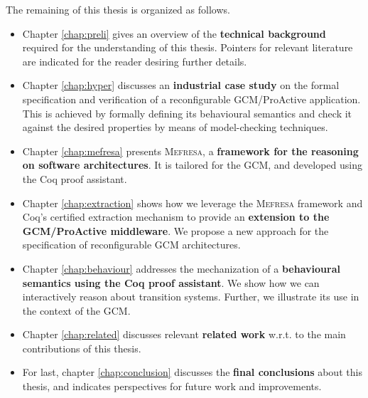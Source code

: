	The remaining of this thesis is organized as follows.


	\begin{itemize}
		\item Chapter \ref{chap:preli} gives an overview of the \textbf{technical background} required for the understanding 
			      of this thesis. Pointers for relevant literature are indicated for the reader desiring further
				  details.				
				
				  
		\item Chapter \ref{chap:hyper} discusses an \textbf{industrial case study} on the formal specification and verification
			     of a reconfigurable GCM/ProActive application. This is achieved by formally defining its behavioural
				 semantics and check it against the desired properties by means of model-checking techniques. 
			     		
		
		\item Chapter \ref{chap:mefresa} presents \textsc{Mefresa}, a \textbf{framework for the reasoning on software architectures}.
				  It is tailored for the \ac{GCM}, and developed using the Coq proof assistant. 
				  
				  
		\item Chapter \ref{chap:extraction} shows how we leverage the \textsc{Mefresa} framework and Coq's certified extraction 
		         mechanism	to provide an \textbf{extension to the GCM/ProActive middleware}. We propose a 
		         new approach for the specification of reconfigurable \ac{GCM} architectures.		
		
		\item Chapter \ref{chap:behaviour} addresses the mechanization of a \textbf{behavioural semantics using the Coq proof assistant}. We show how we can interactively reason about transition
		systems.
			     Further, we illustrate its use in the context of the \ac{GCM}.
		
		
		\item Chapter \ref{chap:related} discusses relevant \textbf{related work} w.r.t. to the main contributions of this thesis.			
				  	
					

		\item For last, chapter \ref{chap:conclusion} discusses the \textbf{final conclusions} about this thesis, and 
		         indicates perspectives for future work and improvements.
		
		
	\end{itemize}



